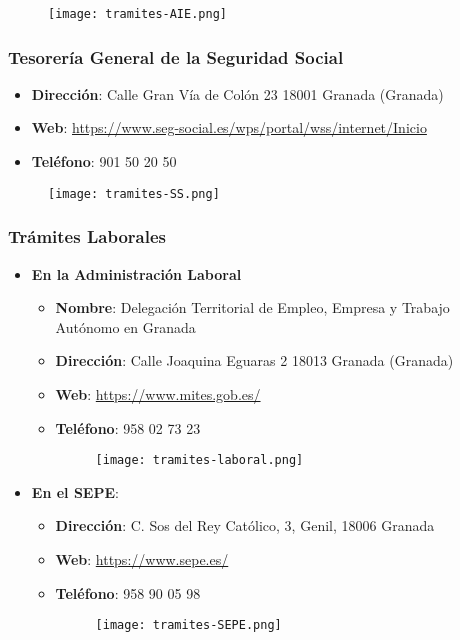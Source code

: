 \begin{figure}[H]
    \centering
    \texttt{[image: tramites-AIE.png]}
\end{figure}

\subsubsection*{Tesorería General de la Seguridad Social}
\begin{itemize}
    \item \textbf{Dirección}: Calle Gran Vía de Colón 23 18001 Granada (Granada)
    \item \textbf{Web}: \url{https://www.seg-social.es/wps/portal/wss/internet/Inicio}
    \item \textbf{Teléfono}: 901 50 20 50
\end{itemize}

\begin{figure}[H]
    \centering
    \texttt{[image: tramites-SS.png]}
\end{figure}

\subsubsection*{Trámites Laborales}

\begin{itemize}
    \item \textbf{En la Administración Laboral}
    \begin{itemize}
        \item \textbf{Nombre}: Delegación Territorial de Empleo, Empresa y Trabajo Autónomo en Granada
        \item \textbf{Dirección}: Calle Joaquina Eguaras 2 18013 Granada (Granada)
        \item \textbf{Web}: \url{https://www.mites.gob.es/}
        \item \textbf{Teléfono}: 958 02 73 23

        \begin{figure}[H]
            \centering
            \texttt{[image: tramites-laboral.png]}
        \end{figure}
    \end{itemize}
    \item \textbf{En el SEPE}:
    \begin{itemize}
        \item \textbf{Dirección}:  C. Sos del Rey Católico, 3, Genil, 18006 Granada
        \item \textbf{Web}: \url{https://www.sepe.es/}
        \item \textbf{Teléfono}: 958 90 05 98

        \begin{figure}[H]
            \centering
            \texttt{[image: tramites-SEPE.png]}
        \end{figure}
    \end{itemize}

\end{itemize}

%
%

